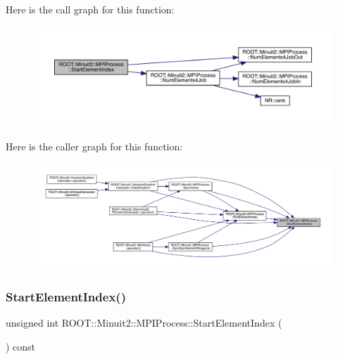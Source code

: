 Here is the call graph for this function\+:
\nopagebreak
\begin{figure}[H]
\begin{center}
\leavevmode
\includegraphics[width=350pt]{dc/d43/classROOT_1_1Minuit2_1_1MPIProcess_a9e6b2dc6f57cc91bb11637b50ba15957_cgraph}
\end{center}
\end{figure}
Here is the caller graph for this function\+:\nopagebreak
\begin{figure}[H]
\begin{center}
\leavevmode
\includegraphics[width=350pt]{dc/d43/classROOT_1_1Minuit2_1_1MPIProcess_a9e6b2dc6f57cc91bb11637b50ba15957_icgraph}
\end{center}
\end{figure}
\mbox{\label{classROOT_1_1Minuit2_1_1MPIProcess_a9e6b2dc6f57cc91bb11637b50ba15957}} 
\subsubsection{\texorpdfstring{StartElementIndex()}{StartElementIndex()}\hspace{0.1cm}{\footnotesize\ttfamily [2/2]}}
{\footnotesize\ttfamily unsigned int R\+O\+O\+T\+::\+Minuit2\+::\+M\+P\+I\+Process\+::\+Start\+Element\+Index (\begin{DoxyParamCaption}{ }\end{DoxyParamCaption}) const\hspace{0.3cm}{\ttfamily [inline]}}

